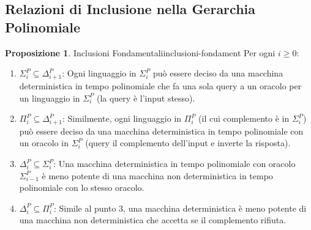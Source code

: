 \documentclass[a4paper]{article}
\theoremstyle{definition} %
\newtheorem{proposition}{Proposizione}
\begin{document}
\subsection{Relazioni di Inclusione nella Gerarchia Polinomiale}
\begin{proposition}{Inclusioni Fondamentali}{inclusioni-fondament}
Per ogni $i \ge 0$:
\begin{enumerate}
    \item $\Sigma_i^P \subseteq \Delta_{i+1}^P$: Ogni linguaggio in $\Sigma_i^P$ può essere deciso da una macchina deterministica in tempo polinomiale che fa una sola query a un oracolo per un linguaggio in $\Sigma_i^P$ (la query è l'input stesso).
    \item $\Pi_i^P \subseteq \Delta_{i+1}^P$: Similmente, ogni linguaggio in $\Pi_i^P$ (il cui complemento è in $\Sigma_i^P$) può essere deciso da una macchina deterministica in tempo polinomiale con un oracolo in $\Sigma_i^P$ (query il complemento dell'input e inverte la risposta).
    \item $\Delta_i^P \subseteq \Sigma_i^P$: Una macchina deterministica in tempo polinomiale con oracolo $\Sigma_{i-1}^P$ è meno potente di una macchina non deterministica in tempo polinomiale con lo stesso oracolo.
    \item $\Delta_i^P \subseteq \Pi_i^P$: Simile al punto 3, una macchina deterministica è meno potente di una macchina non deterministica che accetta se il complemento rifiuta.
\end{enumerate}
\end{proposition}
\end{document}
